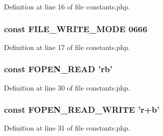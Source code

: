 Definition at line 16 of file constants.\-php.

\hypertarget{constants_8php_a6b9fcdc9259bf9361e8f97e289024242}{
\subsubsection[{F\-I\-L\-E\-\_\-\-W\-R\-I\-T\-E\-\_\-\-M\-O\-D\-E}]{\setlength{\rightskip}{0pt plus 5cm}const F\-I\-L\-E\-\_\-\-W\-R\-I\-T\-E\-\_\-\-M\-O\-D\-E 0666}}\label{constants_8php_a6b9fcdc9259bf9361e8f97e289024242}


Definition at line 17 of file constants.\-php.

\hypertarget{constants_8php_ab6a0a1c6e9ea5f7625b2dba2f7bd286c}{
\subsubsection[{F\-O\-P\-E\-N\-\_\-\-R\-E\-A\-D}]{\setlength{\rightskip}{0pt plus 5cm}const F\-O\-P\-E\-N\-\_\-\-R\-E\-A\-D 'rb'}}\label{constants_8php_ab6a0a1c6e9ea5f7625b2dba2f7bd286c}


Definition at line 30 of file constants.\-php.

\hypertarget{constants_8php_ab98552969950ea978284c998e10d0153}{
\subsubsection[{F\-O\-P\-E\-N\-\_\-\-R\-E\-A\-D\-\_\-\-W\-R\-I\-T\-E}]{\setlength{\rightskip}{0pt plus 5cm}const F\-O\-P\-E\-N\-\_\-\-R\-E\-A\-D\-\_\-\-W\-R\-I\-T\-E 'r+{\bf b}'}}\label{constants_8php_ab98552969950ea978284c998e10d0153}


Definition at line 31 of file constants.\-php.

